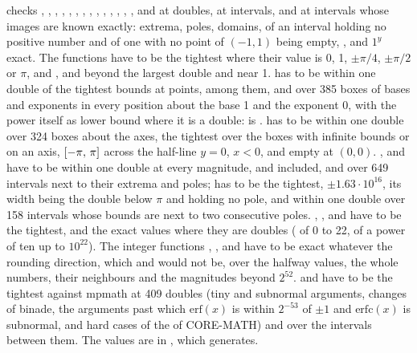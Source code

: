 \documentclass[12pt,a4paper,twoside,openright]{book}
\begin{document}
\medskip
{} checks , , , ,
, , , , , ,
, , , ,  and
 at doubles, at intervals, and at intervals whose images are known
exactly: extrema, poles, domains,  of an interval holding no
positive number and  of one with no point of $(-1, 1)$ being
empty, ,  and $1^y$ exact. The functions have to
be the tightest where their value is 0, 1, $\pm\pi/4$, $\pm\pi/2$ or $\pi$,
and ,  and  beyond the largest double and
near 1.  has to be within one double of the tightest bounds
at points,  among them, and over 385 boxes of bases
and exponents in every position about the base 1 and the exponent 0, with
the power itself as lower bound where it is a double:  is
\code{[2]}.  has to be within one double over 324 boxes about
the axes, the tightest over the boxes with infinite bounds or on an axis,
$[-\pi,\,\pi]$ across the half-line $y=0$, $x<0$, and empty at $(0, 0)$.
,  and  have to be within one double at every
magnitude,  and  included, and over
649 intervals next to their extrema and poles; 
has to be the tightest, $\pm1.63\cdot10^{16}$, its width being the double
below $\pi$ and holding no pole, and  within one double over 158
intervals whose bounds are next to two consecutive poles.\newinvfive{}
, ,  and  have to be the
tightest, and the exact values where they are doubles ( of 0 to
22,  of a power of ten up to $10^{22}$). The integer functions
, ,  and
 have to be exact whatever the rounding
direction, which  and  would not be,
over the halfway values, the whole numbers, their neighbours and the
magnitudes beyond $2^{52}$.  and  have to be the
tightest against mpmath at 409 doubles (tiny and subnormal arguments,
changes of binade, the arguments past which $\mathrm{erf}(x)$ is within
$2^{-53}$ of $\pm1$ and $\mathrm{erfc}(x)$ is subnormal, and hard cases of
the  of CORE-MATH) and over the intervals between
them.\newinvfive{} The values are in , which
 generates.
\end{document}

